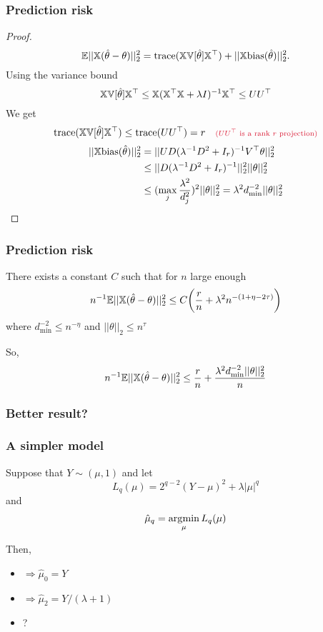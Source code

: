 \documentclass[12pt]{beamer}
\newcommand{\parenthetical}[2]{#1  \scriptstyle \alr{( #2)}}
\begin{document}
\begin{frame}
\frametitle{Prediction risk}
\begin{proof}
\[
\mathbb{E}||\mathbb{X}(\hat\theta - \theta)||_2^2 = \textrm{trace}(\mathbb{X}\mathbb{V}[\hat\theta] \mathbb{X}^{\top}) + ||\mathbb{X}\textrm{bias}(\hat\theta)||_2^2.
\]
Using the variance bound
\[
\mathbb{X}\mathbb{V}[\hat\theta] \mathbb{X}^{\top} \leq \mathbb{X}(\mathbb{X}^{\top}\mathbb{X} + \lambda I)^{-1}\mathbb{X}^{\top} \leq UU^{\top}
\]
We get
\[
\tr(\X\V[\hat\theta] \X^{\top}) \leq \tr(UU^{\top}) = r \parenthetical{\quad}{UU^{\top} \textrm{ is a rank $r$ projection}}
\]
\begin{align}
||\mathbb{X}\textrm{bias}(\hat\theta)||_2^2 
& = 
||UD (\lambda^{-1} D^2 + I_r)^{-1}V^{\top} \theta||_2^2 \\
& \leq 
||D (\lambda^{-1} D^2 + I_r)^{-1}||_2^2||\theta||_2^2\\
& \leq 
(\max_j \frac{\lambda^2}{d_j^2})^2 ||\theta||_2^2  = \lambda^2d_{\min}^{-2}||\theta||_2^2
\end{align}
\end{proof}
\end{frame}

\begin{frame}
\frametitle{Prediction risk}
\begin{theorem}
There exists a constant $C$ such that for $n$ large enough
\[
n^{-1} \mathbb{E} ||\mathbb{X}(\hat\theta - \theta)||_2^2 \leq C \bigg( \frac{r}{ n} + \lambda^2 n^{-(1+\eta - 2\tau)} \bigg)
\]
where $d_{\min}^{-2} \leq n^{-\eta}$ and $||\theta||_2 \leq n^{\tau}$
\end{theorem}

\vsp
So,
\[
n^{-1} \mathbb{E} ||\mathbb{X}(\hat\theta - \theta)||_2^2  \leq \frac{r}{n}+ \frac{ \lambda^2d_{\min}^{-2}||\theta||_2^2}{n}
\]

\end{frame}

\begin{frame}
\frametitle{Better result?}

\end{frame}


\begin{frame}
\frametitle{A simpler model}
Suppose that $Y \sim (\mu,1)$ and let 
\[
L_q(\mu) = 2^{q-2}(Y-\mu)^2 + \lambda |\mu|^q
\]
and
\[
\hat{\mu}_q = \operatorname*{\arg\!\min}_{\mu} L_q(\mu)
\]

Then,

\begin{itemize}
\item {} $\Rightarrow \hat{\mu}_0  = Y$  
\item {} $\Rightarrow \hat{\mu}_2  = Y/(\lambda + 1)$  
\item {}?
\end{itemize}
\end{frame}
\end{document}
